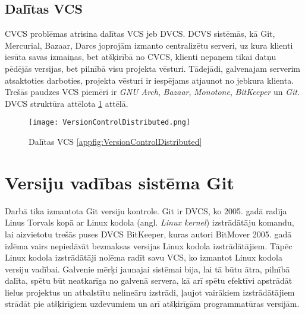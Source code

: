 \subsection{Dalītas VCS}
CVCS problēmas atrisina dalītas VCS jeb DVCS. DCVS sistēmās, kā Git, Mercurial, Bazaar, Darcs joprojām izmanto centralizētu serveri, uz kura klienti iesūta savas izmaiņas, bet atšķirībā no CVCS, klienti nepaņem tikai datņu pēdējās versijas, bet pilnībā visu projekta vēsturi. Tādejādi, galvenajam serverim atsaktoties darboties, projekta vēsturi ir iespējams atjaunot no jebkura klienta. Trešās paudzes VCS piemēri ir \textit{GNU Arch}, \textit{Bazaar}, \textit{Monotone}, \textit{BitKeeper} un \textit{Git}. DVCS struktūra attēlota \ref{fig:VersionControlDistributed} attēlā. \cite[DVCS]{chacon2014progit}
\begin{figure}[H]%
	\centering
	\captionsetup{justification=centering}
	\texttt{[image: VersionControlDistributed.png]}
	\caption{Dalītas VCS \ref{appfig:VersionControlDistributed}}
	\label{fig:VersionControlDistributed}
\end{figure}

\section{Versiju vadības sistēma Git}
Darbā tika izmantota Git versiju kontrole.%
Git ir DVCS, ko 2005. gadā radīja Linus Torvals kopā ar Linux kodola (angl. \textit{Linux kernel}) izstrādātāju komandu, lai aizvietotu trešās puses DVCS BitKeeper, kuras autori BitMover 2005. gadā izlēma vairs nepiedāvāt bezmaksas versijas Linux kodola izstrādātājiem. Tāpēc Linux kodola izstrādātāji nolēma radīt savu VCS, ko izmantot Linux kodola versiju vadībai. Galvenie mērķi jaunajai sistēmai bija, lai tā būtu ātra, pilnībā dalīta, spētu būt neatkarīga no galvenā servera, kā arī spētu efektīvi apstrādāt lielus projektus un atbalstītu nelineāru izstrādi, ļaujot vairākiem izstrādātājiem strādāt pie atšķirīgiem uzdevumiem un arī atšķirīgām programmatūras versijām.

